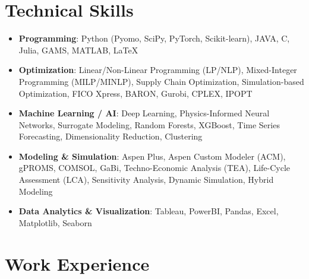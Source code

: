 \documentclass{resume}
\begin{document}
\section{\bfseries Technical Skills}
 \begin{itemize}[leftmargin=0.15in, label={$\vcenter{\hbox{\tiny$\bullet$}}$}, itemsep=0pt, parsep=2pt]
    \small
    \item \textbf{Programming}: Python (Pyomo, SciPy, PyTorch, Scikit-learn), JAVA, C, Julia, GAMS, MATLAB, \LaTeX
    \item \textbf{Optimization}: Linear/Non-Linear Programming (LP/NLP), Mixed-Integer Programming (MILP/MINLP), Supply Chain Optimization, Simulation-based Optimization, FICO Xpress, BARON, Gurobi, CPLEX, IPOPT
    \item \textbf{Machine Learning / AI}: Deep Learning, Physics-Informed Neural Networks, Surrogate Modeling, Random Forests, XGBoost, Time Series Forecasting, Dimensionality Reduction, Clustering
    \item \textbf{Modeling \& Simulation}: Aspen Plus, Aspen Custom Modeler (ACM), gPROMS, COMSOL, GaBi, Techno-Economic Analysis (TEA), Life-Cycle Assessment (LCA), Sensitivity Analysis, Dynamic Simulation, Hybrid Modeling
    \item \textbf{Data Analytics \& Visualization}: Tableau, PowerBI, Pandas, Excel, Matplotlib, Seaborn
 \end{itemize}


\section{\bfseries Work Experience}
  \resumeSubHeadingListStart
\end{document}
